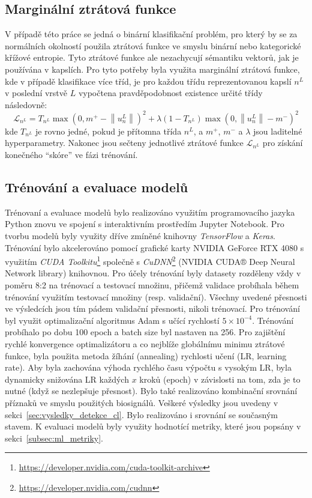 \subsection{Marginální ztrátová funkce}
\label{subsec:marginalni_funkce}
V případě této práce se jedná o binární klasifikační problém, pro který by se za
normálních okolností použila ztrátová funkce ve smyslu binární nebo kategorické
křížové entropie. Tyto ztrátové funkce ale nezachycují sémantiku vektorů, jak je
používána v kapslích. Pro tyto potřeby byla využita marginální ztrátová funkce,
kde v případě klasifikace více tříd, je pro každou třídu reprezentovanou kapslí
$n^L$ v poslední vrstvě $L$ vypočtena pravděpodobnost existence určité třídy
následovně:
\begin{equation}
    \mathcal{L}_{n^L}=T_{n^L} \max \left(0, m^{+}-\left\|u_n^L\right\|\right)^2+\lambda\left(1-T_{n^L}\right) \max \left(0,\left\|u_n^L\right\|-m^{-}\right)^2
\end{equation}
kde $T_{n^L}$ je rovno jedné, pokud je přítomna třída $n^L$, a $m^+$, $m^-$ a
$\lambda$ jsou laditelné hyperparametry. Nakonec jsou sečteny jednotlivé
ztrátové funkce $\mathcal{L}_{n^L}$ pro získání konečného \enquote{skóre} ve
fázi trénování.

\subsection{Trénování a evaluace modelů}
\label{subsec:trenovani_modelu}
Trénovaní a evaluace modelů bylo realizováno využitím programovacího jazyka
Python znovu ve spojení s interaktivním prostředím Jupyter Notebook. Pro tvorbu
modelů byly využity dříve zmíněné knihovny \textit{TensorFlow} a \textit{Keras}.
Trénování bylo akcelerováno pomocí grafické karty NVIDIA GeForce RTX 4080 s
využitím \textit{CUDA
Toolkitu}\footnote{\url{https://developer.nvidia.com/cuda-toolkit-archive}}
společně s \textit{CuDNN}\footnote{\url{https://developer.nvidia.com/cudnn}}
(NVIDIA CUDA® Deep Neural Network library) knihovnou. Pro účely trénování byly
datasety rozděleny vždy v poměru 8:2 na trénovací a testovací množinu, přičemž
validace probíhala během trénování využitím testovací množiny (resp. validační).
Všechny uvedené přesnosti ve výsledcích jsou tím pádem validační přesnosti,
nikoli trénovací. Pro trénování byl využit optimalizační algoritmus Adam s učící
rychlostí $5 \times 10^{-4}$. Trénování probíhalo po dobu 100 epoch a batch size
byl nastaven na 256. Pro zajištění rychlé konvergence optimalizátoru a co
nejblíže globálnímu minimu ztrátové funkce, byla použita metoda žíhání
(annealing) rychlosti učení (\gls{LR}, learning rate). Aby byla zachována výhoda
rychlého času výpočtu s vysokým \gls{LR}, byla dynamicky snižována \gls{LR}
každých $x$ kroků (epoch) v závislosti na tom, zda je to nutné (když se
nezlepšuje přesnost). Bylo také realizováno kombinační srovnání příznaků ve
smyslu použitých biosignálů. Veškeré výsledky jsou uvedeny v
sekci~\ref{sec:vysledky_detekce_cl}. Bylo realizováno i srovnání se současným
stavem. K evaluaci modelů byly využity hodnotící metriky, které jsou popsány v
sekci~\ref{subsec:ml_metriky}.